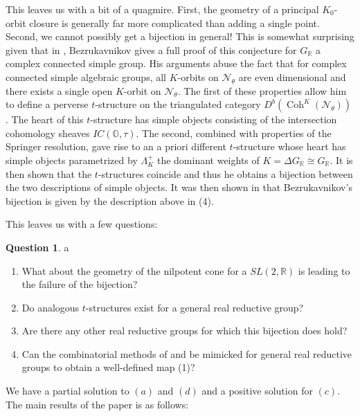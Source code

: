 \documentclass[letterpaper,twosided,11pt]{article}
\theoremstyle{plain}
\theoremstyle{definition}
\newtheorem*{nquestion}{Question}
\theoremstyle{remark}
\newcommand{\R}{\mathbb{R}}
\newcommand{\OO}{\mathbb{O}}
\begin{document}
This leaves us with a bit of a quagmire. First, the geometry of a principal $K_0$-orbit closure is generally far more complicated than adding a single point. Second, we cannot possibly get a bijection in general! This is somewhat surprising given that in \cite{Bez2001}, Bezrukavnikov gives a full proof of this conjecture for $G_\R$ a complex connected simple group. His arguments abuse the fact that for complex connected simple algebraic groups, all $K$-orbits on $\mathcal{N}_\theta$ are even dimensional and there exists a single open $K$-orbit on $\mathcal{N}_\theta.$ The first of these properties allow him to define a perverse $t$-structure on the triangulated category $D^b(\operatorname{Coh}^K(\mathcal{N}_\theta))$. The heart of this $t$-structure has simple objects consisting of the intersection cohomology sheaves $IC(\OO,\tau).$ The second, combined with properties of the Springer resolution, gave rise to an a priori different $t$-structure whose heart has simple objects parametrized by $\Lambda^+_K$ the dominant weights of $K=\Delta G_\R\cong G_\R$. It is then shown that the $t$-structures coincide and thus he obtains a bijection between the two descriptions of simple objects. It was then shown in \cite{Achar2004} that Bezrukavnikov's bijection is given by the description above in (4).    

This leaves us with a few questions: 

\begin{nquestion}
	 \color{white} a\; \color{black} 
	\begin{enumerate} 
		\item What about the geometry of the nilpotent cone for a $SL(2,\R)$ is leading to the failure of the bijection? 
		\item Do analogous $t$-structures exist for a general real reductive group?
		\item Are there any other real reductive groups for which this bijection does hold?   
		\item Can the combinatorial methods of \cite{Achar2001} and \cite{Achar2004} be mimicked for general real reductive groups to obtain a well-defined map (1)? 
	\end{enumerate} 
\end{nquestion} 

We have a partial solution to $(a)$ and $(d)$ and a positive solution for $(c).$ The main results of the paper is as follows: 
\end{document}
